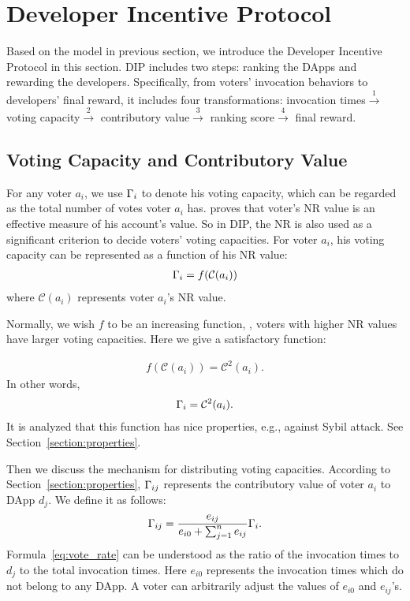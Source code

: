 \section{Developer Incentive Protocol}
\noindent Based on the model in previous section, we introduce the Developer
Incentive Protocol in this section. DIP includes two steps: ranking the DApps
and rewarding the developers. Specifically, from voters' invocation behaviors
to developers' final reward, it includes four transformations: invocation
times$\overset{1}{\rightarrow}$ voting capacity$\overset{2}{\rightarrow}$ contributory
value$\overset{3}{\rightarrow}$ ranking score$\overset{4}{\rightarrow}$ final reward.

\subsection{Voting Capacity and Contributory Value}
\noindent For any voter $a_i$, we use $\Gamma_i$ to denote his voting capacity,
which can be regarded as the total number of votes voter $a_i$ has. \cite{Nebulasyellowpaper} proves that voter's NR value is an effective measure of his account's value. So in DIP, the NR is also used as a significant criterion to decide voters' voting capacities. For voter $a_i$, his voting capacity can be represented as a function of his NR value:
\begin{align}
	\Gamma_i = f(\mathcal{C}(a_i))
\end{align}
where $\mathcal{C}(a_i)$ represents voter $a_i$'s NR value.


Normally, we wish $f$ to be an increasing function, \ie, voters with higher NR
values have larger voting capacities. Here we give a satisfactory function:

\begin{align}
	f(\mathcal{C}(a_i))=\mathcal{C}^2(a_i).
\end{align}
In other words,
\begin{align}
	\Gamma_i = \mathcal{C}^2(a_i).
\end{align}
It is analyzed that this function has nice properties, e.g., against Sybil attack. See Section~\ref{section:properties}.

Then we discuss the mechanism for  distributing voting capacities. According to Section~\ref{section:properties}, $\Gamma_{ij}$ represents the contributory value of voter $a_i$ to DApp $d_j$. We define it as follows:
\begin{align}
	\label{eq:vote_rate}
	\Gamma_{ij} = \frac{e_{ij}}{e_{i0}+\sum_{j=1}^n {e_{ij}}} \Gamma_i.
\end{align}
Formula~\ref{eq:vote_rate} can be understood as the ratio of the invocation
times to $d_j$ to the total invocation times. Here $e_{i0}$ represents the
invocation times which do not belong to any DApp. A voter can arbitrarily adjust the values of $e_{i0}$ and $e_{ij}$'s.

